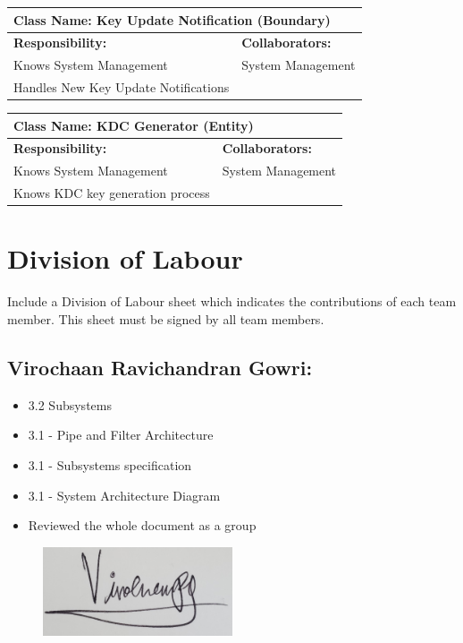 \documentclass[]{article}
\begin{document}
\begin{table}[ht]
	\centering
	\begin{tabular}{|p{7cm}|p{7cm}|}
		\hline
		\multicolumn{2}{|l|}{\textbf{Class Name:} Key Update Notification (Boundary)}             \\
		\hline
		\textbf{Responsibility:}                             & \textbf{Collaborators:}  \\
		\hline
		Knows System Management	         			         & System Management         \\
		Handles New Key Update Notifications				 &						     \\


		\hline
	\end{tabular}
\end{table}

\begin{table}[ht]
	\centering
	\begin{tabular}{|p{7cm}|p{7cm}|}
		\hline
		\multicolumn{2}{|l|}{\textbf{Class Name:} KDC Generator (Entity)}             \\
		\hline
		\textbf{Responsibility:}                             & \textbf{Collaborators:}  \\
		\hline
		Knows System Management	         			         & System Management         \\
		Knows KDC key generation process      				 &						     \\


		\hline
	\end{tabular}
\end{table}

\clearpage
\appendix
\section{Division of Labour}
\label{sec:division_of_labour}
Include a Division of Labour sheet which indicates the contributions of each team member. This sheet must be signed by all team members.
\subsection*{Virochaan Ravichandran Gowri:}
\begin{itemize}
	\item 3.2 Subsystems
	\item 3.1 - Pipe and Filter Architecture
	\item 3.1 - Subsystems specification
	\item 3.1 - System Architecture Diagram
	\item Reviewed the whole document as a group
\end{itemize}
\begin{figure}[h]
	\centering
	\includegraphics[width=0.5\textwidth]{ViroSignature.jpg}
	\label{fig:signature}
\end{figure}
\end{document}
